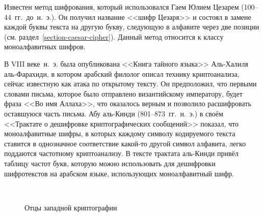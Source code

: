 Известен метод шифрования, который использовался Гаем Юлием Цезарем (100--44~гг.~до~н.~э.). Он получил название <<шифр Цезаря>> и состоял в замене каждой буквы текста на другую букву, следующую в алфавите через две позиции (см. раздел~\ref{section-caesar-cipher}). Данный метод относится к классу моноалфавитных шифров.

В VIII веке~н.~э. была опубликована <<Книга тайного языка>> Аль-Халиля аль-Фарахиди, в котором арабский филолог описал технику криптоанализа, сейчас известную как атака по открытому тексту. Он предположил, что первыми словами письма, которое было отправлено византийскому императору, будет фраза <<Во имя Аллаха>>, что оказалось верным и позволило расшифровать оставшуюся часть письма. Абу аль-Кинди (801--873~гг.~н.~э.) в своём <<Трактате о дешифровке криптографических сообщений>> показал, что моноалфавитные шифры, в которых каждому символу кодируемого текста ставится в однозначное соответствие какой-то другой символ алфавита, легко поддаются частотному криптоанализу. В тексте трактата аль-Кинди привёл таблицу частот букв, которую можно использовать для дешифровки шифротекстов на арабском языке, использующих моноалфавитный шифр.

\begin{figure}[t]
	\centering
	~~~~
	\caption{Отцы западной криптографии}
\end{figure}

